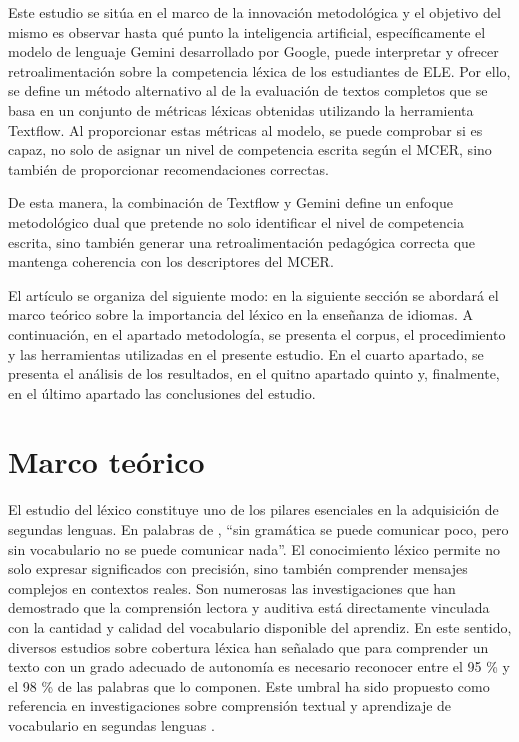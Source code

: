 \documentclass[spanish]{textolivre}
\begin{document}
Este estudio se sitúa en el marco de la innovación metodológica y el objetivo del mismo es observar hasta qué punto la inteligencia artificial, específicamente el modelo de lenguaje Gemini desarrollado por Google, puede interpretar y ofrecer retroalimentación sobre la competencia léxica de los estudiantes de ELE. Por ello, se define un método alternativo al de la evaluación de textos completos que se basa en un conjunto de métricas léxicas obtenidas utilizando la herramienta Textflow. Al proporcionar estas métricas al modelo, se puede comprobar si es capaz, no solo de asignar un nivel de competencia escrita según el MCER, sino también de proporcionar recomendaciones correctas.

De esta manera, la combinación de Textflow y Gemini define un enfoque metodológico dual que pretende no solo identificar el nivel de competencia escrita, sino también generar una retroalimentación pedagógica correcta que mantenga coherencia con los descriptores del MCER.

El artículo se organiza del siguiente modo: en la siguiente sección se abordará el marco teórico sobre la importancia del léxico en la enseñanza de idiomas. A continuación, en el apartado metodología, se presenta el corpus, el procedimiento y las herramientas utilizadas en el presente estudio. En el cuarto apartado, se presenta el análisis de los resultados, en el quitno apartado quinto y, finalmente, en el último apartado las conclusiones del estudio.


\section{Marco teórico}

El estudio del léxico constituye uno de los pilares esenciales en la adquisición de segundas lenguas. En palabras de \textcite[p.~11]{wilkins1972}, “sin gramática se puede comunicar poco, pero sin vocabulario no se puede comunicar nada”. El conocimiento léxico permite no solo expresar significados con precisión, sino también comprender mensajes complejos en contextos reales. Son numerosas las investigaciones que han demostrado que la comprensión lectora y auditiva está directamente vinculada con la cantidad y calidad del vocabulario disponible del aprendiz. En este sentido, diversos estudios sobre cobertura léxica han señalado que para comprender un texto con un grado adecuado de autonomía es necesario reconocer entre el 95 \% y el 98 \% de las palabras que lo componen. Este umbral ha sido propuesto como referencia en investigaciones sobre comprensión textual y aprendizaje de vocabulario en segundas lenguas \cite{robles_garcia2019,degraeuwe_goethals2024}.
\end{document}
